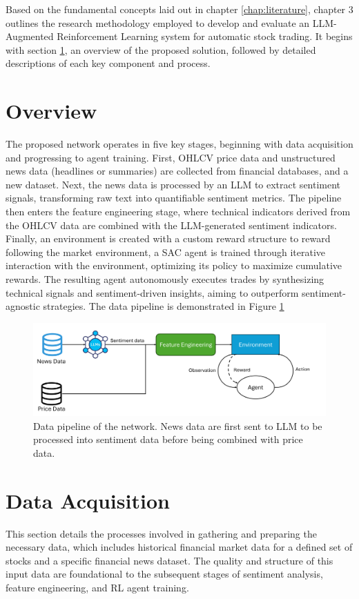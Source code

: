 Based on the fundamental concepts laid out in chapter \ref{chap:literature}, chapter 3  outlines the research methodology employed to develop and evaluate an LLM-Augmented Reinforcement Learning system for automatic stock trading. It begins with section \ref{sec:overview}, an overview of the proposed solution, followed by detailed descriptions of each key component and process.

\section{Overview}
\label{sec:overview}
The proposed network operates in five key stages, beginning with data acquisition and progressing to agent training. First, \gls{OHLCV} price data and unstructured news data (headlines or summaries) are collected from financial databases, and a new dataset. Next, the news data is processed by an \gls{LLM} to extract sentiment signals, transforming raw text into quantifiable sentiment metrics. The pipeline then enters the feature engineering stage, where technical indicators derived from the \gls{OHLCV} data are combined with the \gls{LLM}-generated sentiment indicators. Finally, an environment is created with a custom reward structure to reward following the market environment, a \gls{SAC} agent is trained through iterative interaction with the environment, optimizing its policy to maximize cumulative rewards. The resulting agent autonomously executes trades by synthesizing technical signals and sentiment-driven insights, aiming to outperform sentiment-agnostic strategies. The data pipeline is demonstrated in Figure \ref{fig:pipeline}

\begin{figure}
  \centering
  \includegraphics[width=\linewidth]{images/LLM-RL.png}
  \caption{Data pipeline of the network. News data are first sent to LLM to be processed into sentiment data before being combined with price data.}
  \label{fig:pipeline}
\end{figure}

\section{Data Acquisition}
\label{sec:data}
This section details the processes involved in gathering and preparing the necessary data, which includes historical financial market data for a defined set of stocks and a specific financial news dataset. The quality and structure of this input data are foundational to the subsequent stages of sentiment analysis, feature engineering, and \gls{RL} agent training.

